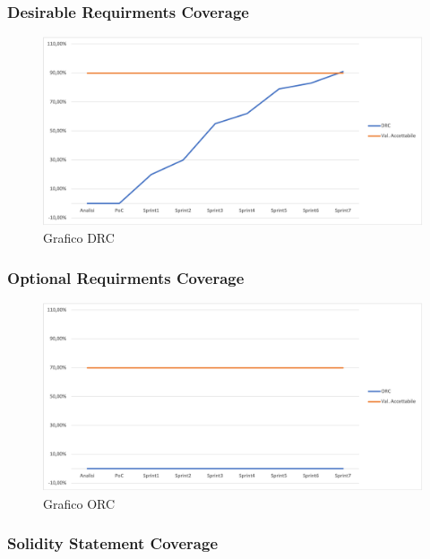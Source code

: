 \subsubsection{Desirable Requirments Coverage}

\begin{figure}[H]
\centering
\includegraphics[width=1\textwidth]{src/img/DRC.png}
\caption{Grafico DRC}
\end{figure}

\subsubsection{Optional Requirments Coverage}

\begin{figure}[H]
\centering
\includegraphics[width=1\textwidth]{src/img/ORC.png}
\caption{Grafico ORC}
\end{figure}

\subsubsection{Solidity Statement Coverage}

